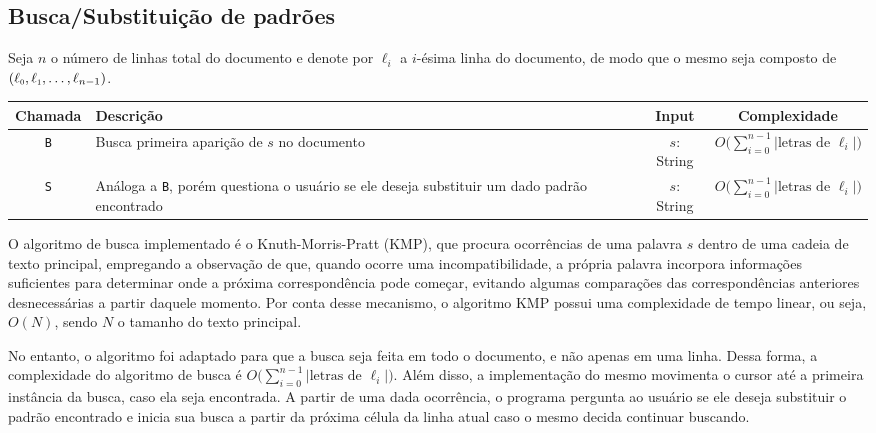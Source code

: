 \documentclass[a4paper, 11pt]{article}
\begin{document}
\subsection{Busca/Substituição de padrões}

Seja $n$ o número de linhas total do documento e denote por $\ell_i$ a $i$-ésima linha do documento, de modo que o mesmo seja composto de $(\sub\ell 0, \sub \ell 1, \ldots, \ell_{n-1})$.
\begin{table}[H]
\centering
\begin{tabularx}{\linewidth}{|c|X|c|c|}
\hline
\textbf{Chamada} & \textbf{Descrição} & \textbf{Input} & \textbf{Complexidade}
\\ 
\hline
\texttt{B} & Busca primeira aparição de $s$ no documento & $s$: String & $O\Big(\sum\limits_{i=0}^{n-1} |\text{letras de }\ell_i|\Big)$ \\
\texttt{S} & Análoga a \texttt B, porém questiona o usuário se ele deseja substituir um dado padrão encontrado & $s$: String & $O\Big(\sum\limits_{i=0}^{n-1} |\text{letras de }\ell_i|\Big)$ \\
\hline
\end{tabularx}
\end{table}

O algoritmo de busca implementado é o Knuth-Morris-Pratt (KMP), que procura ocorrências de uma palavra $s$ dentro de uma cadeia de texto principal, empregando a observação de que, quando ocorre uma incompatibilidade, a própria palavra incorpora informações suficientes para determinar onde a próxima correspondência pode começar, evitando algumas comparações das correspondências anteriores desnecessárias a partir daquele momento. Por conta desse mecanismo, o algoritmo KMP possui uma complexidade de tempo linear, ou seja, $O(N)$, sendo $N$ o tamanho do texto principal. 

No entanto, o algoritmo foi adaptado para que a busca seja feita em todo o documento, e não apenas em uma linha. Dessa forma, a complexidade do algoritmo de busca é $O\Big(\sum\limits_{i=0}^{n-1} |\text{letras de }\ell_i|\Big)$. Além disso, a implementação do mesmo movimenta o cursor até a primeira instância da busca, caso ela seja encontrada. A partir de uma dada ocorrência, o programa pergunta ao usuário se ele deseja substituir o padrão encontrado e inicia sua busca a partir da próxima célula da linha atual caso o mesmo decida continuar buscando.
\end{document}
